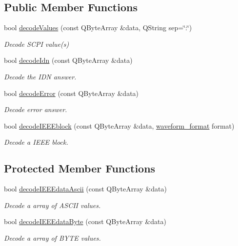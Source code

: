 \subsection*{Public Member Functions}
\begin{DoxyCompactItemize}
\item 
bool \hyperlink{classmdt_frame_codec_scpi_a37a1703b6daee6f6bf91c6afb46191b3}{decodeValues} (const QByteArray \&data, QString sep=\char`\"{}:\char`\"{})
\begin{DoxyCompactList}\small\item\em Decode SCPI value(s) \end{DoxyCompactList}\item 
bool \hyperlink{classmdt_frame_codec_scpi_a6ddd1b8e23252dc7f03c279a030cb36f}{decodeIdn} (const QByteArray \&data)
\begin{DoxyCompactList}\small\item\em Decode the IDN answer. \end{DoxyCompactList}\item 
bool \hyperlink{classmdt_frame_codec_scpi_a9e38d8afadc7ff37821620feea6b0899}{decodeError} (const QByteArray \&data)
\begin{DoxyCompactList}\small\item\em Decode error answer. \end{DoxyCompactList}\item 
bool \hyperlink{classmdt_frame_codec_scpi_a0123b42b9e351b0ef3c13d34a5c4d45e}{decodeIEEEblock} (const QByteArray \&data, \hyperlink{classmdt_frame_codec_scpi_a1aafb008a4207cc922f46fe905b3f17d}{waveform\_\-format} format)
\begin{DoxyCompactList}\small\item\em Decode a IEEE block. \end{DoxyCompactList}\end{DoxyCompactItemize}
\subsection*{Protected Member Functions}
\begin{DoxyCompactItemize}
\item 
bool \hyperlink{classmdt_frame_codec_scpi_aa6596dc898438be704191ad282d02100}{decodeIEEEdataAscii} (const QByteArray \&data)
\begin{DoxyCompactList}\small\item\em Decode a array of ASCII values. \end{DoxyCompactList}\item 
bool \hyperlink{classmdt_frame_codec_scpi_ab70c6c3d2d91ddff065952b6c2db8345}{decodeIEEEdataByte} (const QByteArray \&data)
\begin{DoxyCompactList}\small\item\em Decode a array of BYTE values. \end{DoxyCompactList}\end{DoxyCompactItemize}


